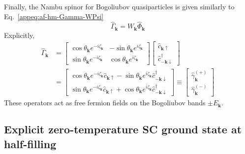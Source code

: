 Finally, the Nambu spinor for Bogoliubov quasiparticles is given similarly to Eq.~\eqref{appeq:af-hm-Gamma-WPsi}
\begin{equation}\label{appeq:sc-hm-Gamma-WPsi}
	\hat\Gamma_\mathbf{k} = W_\mathbf{k} \hat \Phi_\mathbf{k}
\end{equation}
Explicitly,
\begin{align}
	\hat\Gamma_\mathbf{k} &= \begin{bmatrix}
		\cos \theta_\mathbf{k} e^{-i\zeta_\mathbf{k}} & - \sin \theta_\mathbf{k} e^{i\zeta_\mathbf{k}} \\
		\sin \theta_\mathbf{k} e^{-i\zeta_\mathbf{k}} & \cos \theta_\mathbf{k} e^{i\zeta_\mathbf{k}}
	\end{bmatrix} \begin{bmatrix}
		\hat c_{\mathbf{k}\uparrow} \\
		\hat c_{-\mathbf{k}\downarrow}^\dagger 
	\end{bmatrix} \nonumber \\
	&= \begin{bmatrix}
		\cos \theta_\mathbf{k} e^{-i\zeta_\mathbf{k}} \hat c_{\mathbf{k}\uparrow} - \sin \theta_\mathbf{k} e^{i\zeta_\mathbf{k}} \hat c_{-\mathbf{k}\downarrow}^\dagger  \\
		\sin \theta_\mathbf{k} e^{-i\zeta_\mathbf{k}} \hat c_{\mathbf{k}\uparrow} + \cos \theta_\mathbf{k} e^{i\zeta_\mathbf{k}} \hat c_{-\mathbf{k}\downarrow}^\dagger
	\end{bmatrix} \equiv
	\begin{bmatrix}
		\hat \gamma_\mathbf{k}^{(+)} \\
		\hat \gamma_\mathbf{k}^{(-)} 
	\end{bmatrix} \label{appeq:sc-hm-gamma-ops-transform}
\end{align}
These operators act as free fermion fields on the Bogoliubov bands $\pm E_\mathbf{k}$.

\subsection{Explicit zero-temperature SC ground state at half-filling}\label{appsubsec:sc-zero-T-half-filling-gs}

